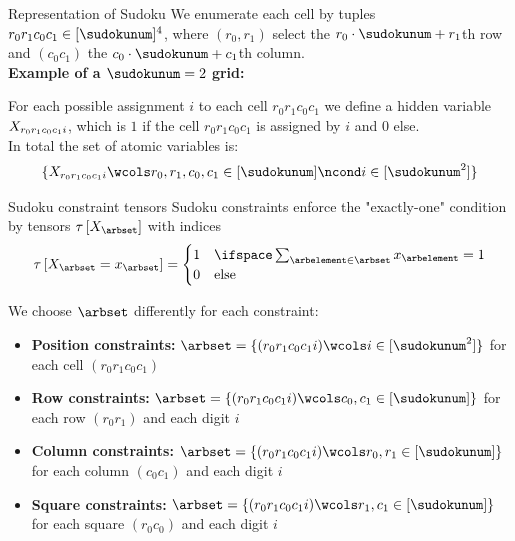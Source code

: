 \documentclass{beamer}
\begin{document}
    \begin{frame}{Representation of Sudoku}
        We enumerate each cell by tuples $r_0r_1c_0c_1\in[\sudokunum]^4$, where $(r_0,r_1)$ select the $r_0\cdot\sudokunum+r_1$th row and $(c_0c_1)$ the $c_0\cdot\sudokunum+c_1$th column.\\
        {\bf Example of a $\sudokunum=2$ grid:}
        
        For each possible assignment $i$ to each cell $r_0r_1c_0c_1$ we define a hidden variable $X_{r_0r_1c_0c_1i}$, which is $1$ if the cell $r_0r_1c_0c_1$ is assigned by $i$ and $0$ else. \\

        In total the set of atomic variables is:
        \begin{align*}
            \{\catvariableof{r_0r_1c_0c_1i} \wcols r_0,r_1,c_0,c_1 \in [\sudokunum]  \ncond i \in [\sudokunum^2]\}
        \end{align*}


    \end{frame}

    \begin{frame}{Sudoku constraint tensors}
        Sudoku constraints enforce the "exactly-one" condition by tensors $\hypercoreat{\catvariableof{\arbset}}$ with indices
        \begin{align*}
            \hypercoreat{\indexedcatvariableof{\arbset}}
            = \begin{cases}
                  1 & \ifspace \sum_{\arbelement\in\arbset}\catindexof{\arbelement}=1 \\
                  0 & \text{else}
            \end{cases}
        \end{align*}

        We choose $\arbset$ differently for each constraint:
        \begin{itemize}
            \item {\bf Position constraints:} $\arbset=\{(r_0r_1c_0c_1i) \wcols i\in[\sudokunum^2]\}$ for each cell $(r_0r_1c_0c_1)$
            \item {\bf Row constraints:} $\arbset=\{(r_0r_1c_0c_1i) \wcols c_0,c_1\in[\sudokunum]\}$ for each row $(r_0r_1)$ and each digit $i$
            \item {\bf Column constraints:} $\arbset=\{(r_0r_1c_0c_1i) \wcols r_0,r_1\in[\sudokunum]\}$ for each column $(c_0c_1)$ and each digit $i$
            \item {\bf Square constraints:} $\arbset=\{(r_0r_1c_0c_1i) \wcols r_1,c_1\in[\sudokunum]\}$ for each square $(r_0c_0)$ and each digit $i$
        \end{itemize}
    \end{frame}
\end{document}
